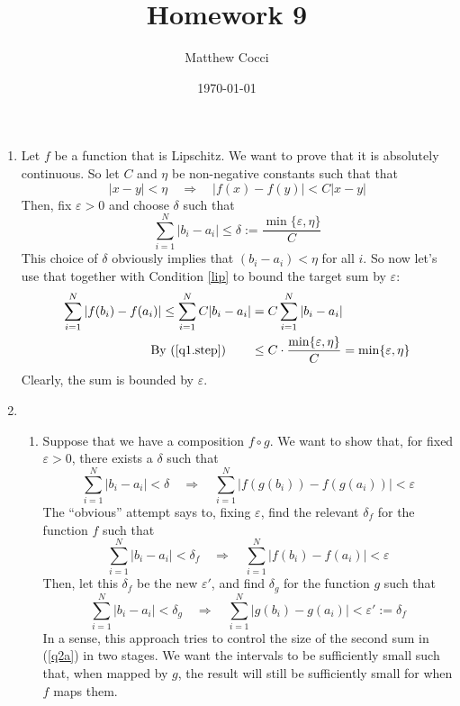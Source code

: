 \documentclass[12pt]{article}
\author{Matthew Cocci}
\title{\textbf{Homework 9}}
\date{\today}
\theoremstyle{plain}
\theoremstyle{definition}
\theoremstyle{remark}
\begin{document}
\maketitle 

\begin{enumerate} 

\item Let $f$ be a function that is Lipschitz. We want to prove that it is absolutely continuous. So let $C$ and $\eta$ be non-negative constants such that that 
\begin{equation}
\label{lip}
    |x-y|<\eta
    \quad\Rightarrow\quad
    |f(x)-f(y)|<C|x-y|
\end{equation}
Then, fix $\varepsilon>0$ and choose $\delta$ such that
\begin{equation}
\label{q1.step}
    \sum_{i=1}^N|b_i-a_i| \leq 
    \delta := \frac{\min\{\varepsilon,\eta\}}{C}
\end{equation}
This choice of $\delta$ obviously implies that $(b_i-a_i)<\eta$ for all $i$. So 
now let's use that together with Condition \ref{lip} to bound the target sum by $\varepsilon$:
\begin{align*}
    \sum_{i=1}^N |f(b_i)-f(a_i)| \leq 
    \sum_{i=1}^N C|b_i-a_i| &=
    C \sum_{i=1}^N |b_i-a_i| \\
    \text{By (\ref{q1.step})} \qquad
    &\leq 
    C \cdot \frac{\min\{\varepsilon,\eta\}}{C}
    = \min\{\varepsilon,\eta\}
\end{align*}
Clearly, the sum is bounded by $\varepsilon$.




\item 
\begin{enumerate} 

\item Suppose that we have a composition $f\circ g$. We want to show that, for fixed $\varepsilon>0$, there exists a $\delta$ such that 
\begin{equation}
    \label{q2a}
    \sum_{i=1}^N |b_i-a_i|<\delta 
    \quad\Rightarrow\quad
    \sum_{i=1}^N |f(g(b_i))-f(g(a_i))|<\varepsilon
\end{equation}
The ``obvious'' attempt says to, fixing $\varepsilon$, find the relevant $\delta_f$ for the function $f$ such that
\[
    \sum_{i=1}^N |b_i-a_i|<\delta_f
    \quad\Rightarrow\quad
    \sum_{i=1}^N |f(b_i)-f(a_i)|<\varepsilon
\]
Then, let this $\delta_f$ be the new $\varepsilon'$, and find $\delta_g$ for the function $g$ such that
\[
    \sum_{i=1}^N |b_i-a_i|<\delta_g
    \quad\Rightarrow\quad
    \sum_{i=1}^N |g(b_i)-g(a_i)|<\varepsilon' := \delta_f
\]
In a sense, this approach tries to control the size of the second sum in (\ref{q2a}) in two stages. We want the intervals to be sufficiently small such that, when mapped by $g$, the result will still be sufficiently small for when $f$ maps them.


\end{enumerate}
\end{enumerate}
\end{document}
